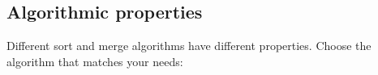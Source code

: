 % 

\subsection{Algorithmic properties}

Different sort and merge algorithms have different properties.
Choose the algorithm that matches your needs:

